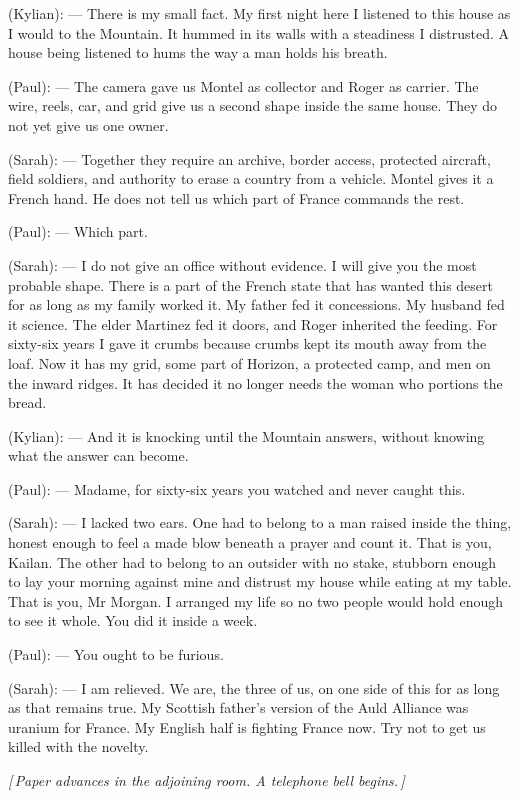 \begin{room}
(Kylian): --- There is my small fact. My first night here I listened to this house as I would to the Mountain. It hummed in its walls with a steadiness I distrusted. A house being listened to hums the way a man holds his breath.

(Paul): --- The camera gave us Montel as collector and Roger as carrier. The wire, reels, car, and grid give us a second shape inside the same house. They do not yet give us one owner.

(Sarah): --- Together they require an archive, border access, protected aircraft, field soldiers, and authority to erase a country from a vehicle. Montel gives it a French hand. He does not tell us which part of France commands the rest.

(Paul): --- Which part.

(Sarah): --- I do not give an office without evidence. I will give you the most probable shape. There is a part of the French state that has wanted this desert for as long as my family worked it. My father fed it concessions. My husband fed it science. The elder Martinez fed it doors, and Roger inherited the feeding. For sixty-six years I gave it crumbs because crumbs kept its mouth away from the loaf. Now it has my grid, some part of Horizon, a protected camp, and men on the inward ridges. It has decided it no longer needs the woman who portions the bread.

(Kylian): --- And it is knocking until the Mountain answers, without knowing what the answer can become.

(Paul): --- Madame, for sixty-six years you watched and never caught this.

(Sarah): --- I lacked two ears. One had to belong to a man raised inside the thing, honest enough to feel a made blow beneath a prayer and count it. That is you, Kailan. The other had to belong to an outsider with no stake, stubborn enough to lay your morning against mine and distrust my house while eating at my table. That is you, Mr Morgan. I arranged my life so no two people would hold enough to see it whole. You did it inside a week.

(Paul): --- You ought to be furious.

(Sarah): --- I am relieved. We are, the three of us, on one side of this for as long as that remains true. My Scottish father's version of the Auld Alliance was uranium for France. My English half is fighting France now. Try not to get us killed with the novelty.

\centerline{\textit{[\,Paper advances in the adjoining room. A telephone bell begins.\,]}}


\end{room}
